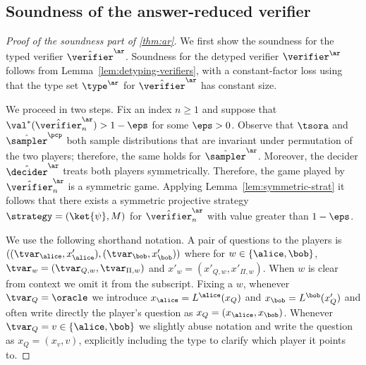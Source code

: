 \subsection{Soundness of the answer-reduced verifier}
\label{sec:ar-soundness}



\begin{proof}[Proof of the soundness part of \cref{thm:ar}]
  We first show the soundness for the typed verifier $\tvans$.
  Soundness for the detyped verifier $\vans$ follows from
  Lemma~\ref{lem:detyping-verifiers}, with a constant-factor loss using that the
  type set $\type^\ar$ for $\tvans$ has constant size.
	
  We proceed in two steps.
  Fix an index $n\geq 1$ and suppose that $\val^*(\tvans_n) > 1-\eps$ for
  some $\eps > 0$.
  Observe that $\tsora$ and $\tspcp$ both sample distributions that
  are invariant under permutation of the two players; therefore, the same holds
  for $\tsans$.
  Moreover, the decider $\tdans$ treats both players symmetrically.
  Therefore, the game played by $\tvans_n$ is a symmetric game.
  Applying Lemma~\ref{lem:symmetric-strat} it follows that there exists a
  symmetric projective strategy $\strategy = (\ket{\psi},M)$ for
  $\tvans_n$ with value greater than $1 - \eps$.
	
  We use the following shorthand notation.
  A pair of questions to the players is
  $((\tvar_\alice,x'_\alice),(\tvar_\bob,x'_\bob))$ where for
  $w\in\{\alice,\bob\}$, $\tvar_w=(\tvar_{Q,w},\tvar_{\Pi,w})$ and
  $x'_w=(x'_{Q,w}, x'_{\Pi,w})$.
  When $w$ is clear from context we omit it from the subscript.
  Fixing a $w$, whenever $\tvar_Q = \oracle$ we introduce $x_\alice =
  L^\alice(x_Q)$ and $x_\bob =L^\bob(x'_Q)$ and often write directly the player's
  question as $x_Q = (x_\alice,x_\bob)$.
  Whenever $\tvar_Q=v \in \{\alice,\bob\}$ we slightly abuse notation and write
  the question as $x_Q = (x_{v},v)$, explicitly including the type to clarify
  which player it points to.
	

\end{proof}
